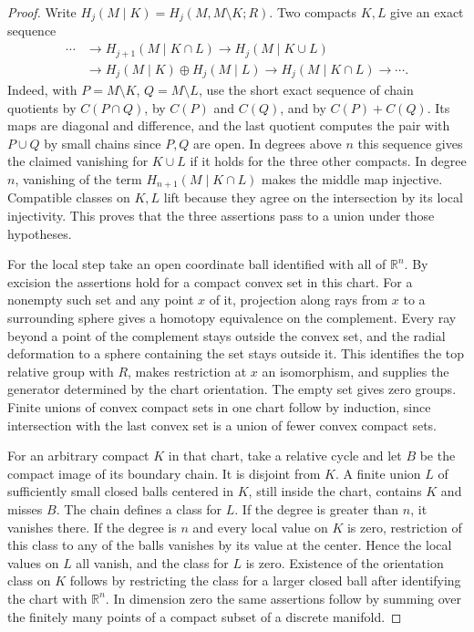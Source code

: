 \documentclass[11pt,oneside,openany]{book}
\theoremstyle{plain}
\theoremstyle{definition}
\theoremstyle{remark}
\begin{document}
\begin{proof}
Write \(H_j(M\mid K)=H_j(M,M\setminus K;R)\). Two compacts
\(K,L\) give an exact sequence
\[
 \begin{aligned}
 \cdots&\to H_{j+1}(M\mid K\cap L)
 \to H_j(M\mid K\cup L)\\
 &\to H_j(M\mid K)\oplus H_j(M\mid L)
 \to H_j(M\mid K\cap L)\to\cdots .
 \end{aligned}
\]
Indeed, with \(P=M\setminus K\), \(Q=M\setminus L\), use the
short exact sequence of chain quotients by
\(C(P\cap Q)\), by \(C(P)\) and \(C(Q)\), and by
\(C(P)+C(Q)\). Its maps are diagonal and difference, and
the last quotient computes the pair with \(P\cup Q\) by
small chains since \(P,Q\) are open. In degrees above \(n\)
this sequence gives the claimed vanishing for \(K\cup L\)
if it holds for the three other compacts. In degree \(n\),
vanishing of the term \(H_{n+1}(M\mid K\cap L)\) makes the
middle map injective. Compatible classes on \(K,L\) lift
because they agree on the intersection by its local
injectivity. This proves that the three assertions pass to
a union under those hypotheses.

For the local step take an open coordinate ball identified
with all of \(\mathbb R^n\). By excision the assertions hold
for a compact convex set in this chart. For a nonempty such set and any point
\(x\) of it, projection along rays from \(x\) to a surrounding
sphere gives a homotopy equivalence on the complement.
Every ray beyond a point of the complement stays outside
the convex set, and the radial deformation to a sphere
containing the set stays outside it. This identifies the
top relative group with \(R\), makes restriction at \(x\)
an isomorphism, and supplies the generator determined by
the chart orientation. The empty set gives zero groups.
Finite unions of convex compact sets in one chart follow
by induction, since intersection with the last convex set
is a union of fewer convex compact sets.

For an arbitrary compact \(K\) in that chart, take a relative
cycle and let \(B\) be the compact image of its boundary
chain. It is disjoint from \(K\). A finite union \(L\) of
sufficiently small closed balls centered in \(K\), still inside
the chart, contains \(K\) and misses \(B\). The chain defines
a class for \(L\). If the degree is greater than \(n\), it
vanishes there. If the degree is \(n\) and every local value
on \(K\) is zero, restriction of this class to any of the
balls vanishes by its value at the center. Hence the local
values on \(L\) all vanish, and the class for \(L\) is zero.
Existence of the orientation class on \(K\) follows by
restricting the class for a larger closed ball after identifying
the chart with \(\mathbb R^n\). In dimension zero the same
assertions follow by summing over the finitely many points
of a compact subset of a discrete manifold.


\end{proof}
\end{document}
